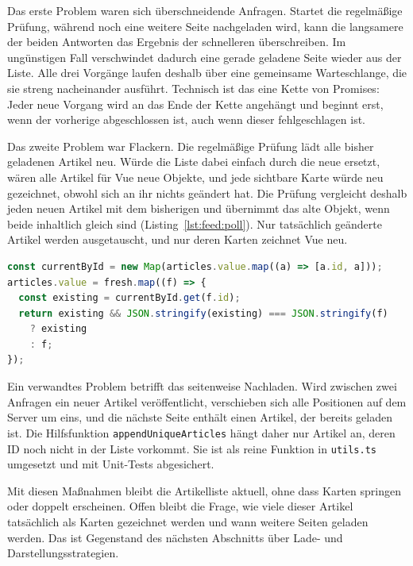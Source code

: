 Das erste Problem waren sich überschneidende Anfragen.
Startet die regelmäßige Prüfung, während noch eine weitere Seite nachgeladen wird, kann die langsamere der beiden Antworten das Ergebnis der schnelleren überschreiben.
Im ungünstigen Fall verschwindet dadurch eine gerade geladene Seite wieder aus der Liste.
Alle drei Vorgänge laufen deshalb über eine gemeinsame Warteschlange, die sie streng nacheinander ausführt.
Technisch ist das eine Kette von Promises: Jeder neue Vorgang wird an das Ende der Kette angehängt und beginnt erst, wenn der vorherige abgeschlossen ist, auch wenn dieser fehlgeschlagen ist.

Das zweite Problem war Flackern.
Die regelmäßige Prüfung lädt alle bisher geladenen Artikel neu.
Würde die Liste dabei einfach durch die neue ersetzt, wären alle Artikel für Vue neue Objekte, und jede sichtbare Karte würde neu gezeichnet, obwohl sich an ihr nichts geändert hat.
Die Prüfung vergleicht deshalb jeden neuen Artikel mit dem bisherigen und übernimmt das alte Objekt, wenn beide inhaltlich gleich sind (Listing~\ref{lst:feed:poll}).
Nur tatsächlich geänderte Artikel werden ausgetauscht, und nur deren Karten zeichnet Vue neu.

\begin{lstlisting}[float=tbp,language=TypeScript,caption={Übernahme unveränderter Artikel bei der regelmäßigen Prüfung (gekürzt)},label=lst:feed:poll]
const currentById = new Map(articles.value.map((a) => [a.id, a]));
articles.value = fresh.map((f) => {
  const existing = currentById.get(f.id);
  return existing && JSON.stringify(existing) === JSON.stringify(f)
    ? existing
    : f;
});
\end{lstlisting}

Ein verwandtes Problem betrifft das seitenweise Nachladen.
Wird zwischen zwei Anfragen ein neuer Artikel veröffentlicht, verschieben sich alle Positionen auf dem Server um eins, und die nächste Seite enthält einen Artikel, der bereits geladen ist.
Die Hilfsfunktion \texttt{appendUniqueArticles} hängt daher nur Artikel an, deren ID noch nicht in der Liste vorkommt.
Sie ist als reine Funktion in \texttt{utils.ts} umgesetzt und mit Unit-Tests abgesichert.

Mit diesen Maßnahmen bleibt die Artikelliste aktuell, ohne dass Karten springen oder doppelt erscheinen.
Offen bleibt die Frage, wie viele dieser Artikel tatsächlich als Karten gezeichnet werden und wann weitere Seiten geladen werden.
Das ist Gegenstand des nächsten Abschnitts über Lade- und Darstellungsstrategien.
